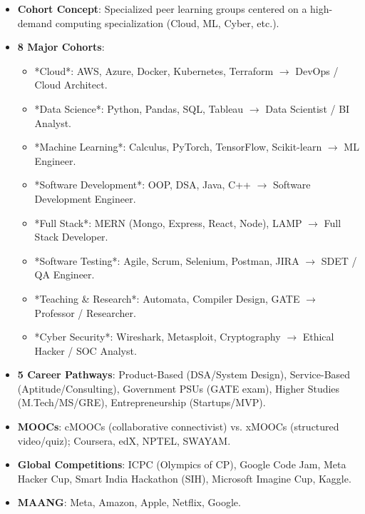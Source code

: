 \begin{quickrevision}
\begin{itemize}
    \item \textbf{Cohort Concept}: Specialized peer learning groups centered on a high-demand computing specialization (Cloud, ML, Cyber, etc.).
    \item \textbf{8 Major Cohorts}:
    \begin{itemize}
        \item *Cloud*: AWS, Azure, Docker, Kubernetes, Terraform $\rightarrow$ DevOps / Cloud Architect.
        \item *Data Science*: Python, Pandas, SQL, Tableau $\rightarrow$ Data Scientist / BI Analyst.
        \item *Machine Learning*: Calculus, PyTorch, TensorFlow, Scikit-learn $\rightarrow$ ML Engineer.
        \item *Software Development*: OOP, DSA, Java, C++ $\rightarrow$ Software Development Engineer.
        \item *Full Stack*: MERN (Mongo, Express, React, Node), LAMP $\rightarrow$ Full Stack Developer.
        \item *Software Testing*: Agile, Scrum, Selenium, Postman, JIRA $\rightarrow$ SDET / QA Engineer.
        \item *Teaching \& Research*: Automata, Compiler Design, GATE $\rightarrow$ Professor / Researcher.
        \item *Cyber Security*: Wireshark, Metasploit, Cryptography $\rightarrow$ Ethical Hacker / SOC Analyst.
    \end{itemize}
    \item \textbf{5 Career Pathways}: Product-Based (DSA/System Design), Service-Based (Aptitude/Consulting), Government PSUs (GATE exam), Higher Studies (M.Tech/MS/GRE), Entrepreneurship (Startups/MVP).
    \item \textbf{MOOCs}: cMOOCs (collaborative connectivist) vs. xMOOCs (structured video/quiz); Coursera, edX, NPTEL, SWAYAM.
    \item \textbf{Global Competitions}: ICPC (Olympics of CP), Google Code Jam, Meta Hacker Cup, Smart India Hackathon (SIH), Microsoft Imagine Cup, Kaggle.
    \item \textbf{MAANG}: Meta, Amazon, Apple, Netflix, Google.
\end{itemize}
\end{quickrevision}

